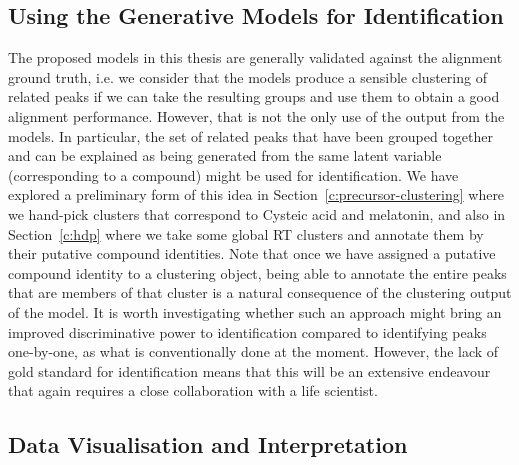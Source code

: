 \subsection{Using the Generative Models for Identification}

The proposed models in this thesis are generally validated against the alignment ground truth, i.e. we consider that the models produce a sensible clustering of related peaks if we can take the resulting groups and use them to obtain a good alignment performance. However, that is not the only use of the output from the models. In particular, the set of related peaks that have been grouped together and can be explained as being generated from the same latent variable (corresponding to a compound) might be used for identification. We have explored a preliminary form of this idea in Section~\ref{c:precursor-clustering} where we hand-pick clusters that correspond to Cysteic acid and melatonin, and also in Section~\ref{c:hdp} where we take some global RT clusters and annotate them by their putative compound identities. Note that once we have assigned a putative compound identity to a clustering object, being able to annotate the entire peaks that are members of that cluster is a natural consequence of the clustering output of the model. It is worth investigating whether such an approach might bring an improved discriminative power to identification compared to identifying peaks one-by-one, as what is conventionally done at the moment. However, the lack of gold standard for identification means that this will be an extensive endeavour that again requires a close collaboration with a life scientist.

\subsection{Data Visualisation and Interpretation}

